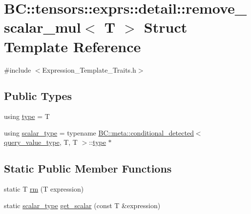 \hypertarget{structBC_1_1tensors_1_1exprs_1_1detail_1_1remove__scalar__mul}{}\section{BC\+:\+:tensors\+:\+:exprs\+:\+:detail\+:\+:remove\+\_\+scalar\+\_\+mul$<$ T $>$ Struct Template Reference}
\label{structBC_1_1tensors_1_1exprs_1_1detail_1_1remove__scalar__mul}


{\ttfamily \#include $<$Expression\+\_\+\+Template\+\_\+\+Traits.\+h$>$}

\subsection*{Public Types}
\begin{DoxyCompactItemize}
\item 
using \hyperlink{structBC_1_1tensors_1_1exprs_1_1detail_1_1remove__scalar__mul_a39776e09dafee812e776b7a8cccc09c7}{type} = T
\item 
using \hyperlink{structBC_1_1tensors_1_1exprs_1_1detail_1_1remove__scalar__mul_a5eb0d4ddddb82b0232bab55f7c3ed165}{scalar\+\_\+type} = typename \hyperlink{structBC_1_1meta_1_1conditional__detected}{B\+C\+::meta\+::conditional\+\_\+detected}$<$ \hyperlink{namespaceBC_1_1tensors_1_1exprs_1_1detail_aa067d25adc2a68a08de1456648d9bf2c}{query\+\_\+value\+\_\+type}, T, T $>$\+::\hyperlink{structBC_1_1tensors_1_1exprs_1_1detail_1_1remove__scalar__mul_a39776e09dafee812e776b7a8cccc09c7}{type} $\ast$
\end{DoxyCompactItemize}
\subsection*{Static Public Member Functions}
\begin{DoxyCompactItemize}
\item 
static T \hyperlink{structBC_1_1tensors_1_1exprs_1_1detail_1_1remove__scalar__mul_a4cd6beceb8536d13c2a16eaf88bd6d0b}{rm} (T expression)
\item 
static \hyperlink{structBC_1_1tensors_1_1exprs_1_1detail_1_1remove__scalar__mul_a5eb0d4ddddb82b0232bab55f7c3ed165}{scalar\+\_\+type} \hyperlink{structBC_1_1tensors_1_1exprs_1_1detail_1_1remove__scalar__mul_a3d7b081b449e42a3903043267792ec88}{get\+\_\+scalar} (const T \&expression)
\end{DoxyCompactItemize}


